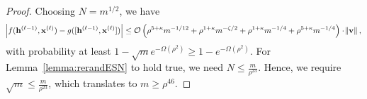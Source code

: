 \begin{proof}
	Choosing $N = m^{1/2}$, we have
	\begin{equation*}
		\abs{ f(\mathbf{h}^{(\ell-1)}, \mathbf{x}^{(\ell)}) - g([\mathbf{h}^{(\ell-1)}, \mathbf{x}^{(\ell)}])} \le \mathcal{O}\left(\rho^{5 + \kappa} m^{-1/12} + \rho^{1+\kappa} m^{-\zeta/2} + \rho^{1+\kappa} m^{-1/4} + \rho^{5+\kappa} m^{-1/4}  \right) \cdot \norm{\mathbf{v}},
	\end{equation*}
	with probability at least $1 -  \sqrt{m} e^{-\Omega(\rho^2)} \ge 1 - e^{-\Omega(\rho^2)}$.
	For Lemma~\ref{lemma:rerandESN} to hold true, we need $N \le \frac{m}{\rho^{23}}$. Hence, we require $\sqrt{m} \le \frac{m}{\rho^{23}}$, which translates to $m \ge \rho^{46}$.
	
	
	
	
	
	
	

\end{proof}

